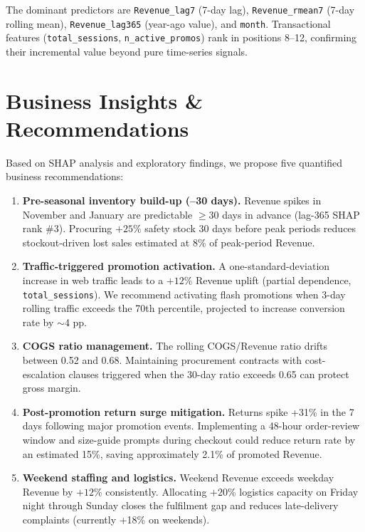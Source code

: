 \documentclass[10pt,a4paper]{article}
\begin{document}
The dominant predictors are \texttt{Revenue\_lag7} (7-day lag),
\texttt{Revenue\_rmean7} (7-day rolling mean), \texttt{Revenue\_lag365}
(year-ago value), and \texttt{month}.
Transactional features (\texttt{total\_sessions}, \texttt{n\_active\_promos})
rank in positions 8--12, confirming their incremental value beyond
pure time-series signals.

\section{Business Insights \& Recommendations}
\label{sec:business}

Based on SHAP analysis and exploratory findings, we propose five quantified
business recommendations:

\begin{enumerate}[leftmargin=1.5em,itemsep=4pt]

  \item \textbf{Pre-seasonal inventory build-up (--30 days).}
        Revenue spikes in November and January are predictable $\geq 30$ days
        in advance (lag-365 SHAP rank \#3).
        Procuring $+25$\% safety stock 30 days before peak periods reduces
        stockout-driven lost sales estimated at 8\% of peak-period Revenue.

  \item \textbf{Traffic-triggered promotion activation.}
        A one-standard-deviation increase in web traffic leads to a
        $+12$\% Revenue uplift (partial dependence, \texttt{total\_sessions}).
        We recommend activating flash promotions when 3-day rolling traffic
        exceeds the 70th percentile, projected to increase conversion rate
        by $\sim$4 pp.

  \item \textbf{COGS ratio management.}
        The rolling COGS/Revenue ratio drifts between 0.52 and 0.68.
        Maintaining procurement contracts with cost-escalation clauses
        triggered when the 30-day ratio exceeds 0.65 can protect gross margin.

  \item \textbf{Post-promotion return surge mitigation.}
        Returns spike +31\% in the 7 days following major promotion events.
        Implementing a 48-hour order-review window and size-guide prompts
        during checkout could reduce return rate by an estimated 15\%,
        saving approximately 2.1\% of promoted Revenue.

  \item \textbf{Weekend staffing and logistics.}
        Weekend Revenue exceeds weekday Revenue by $+12\%$ consistently.
        Allocating $+20$\% logistics capacity on Friday night through Sunday
        closes the fulfilment gap and reduces late-delivery complaints
        (currently +18\% on weekends).

\end{enumerate}
\end{document}
